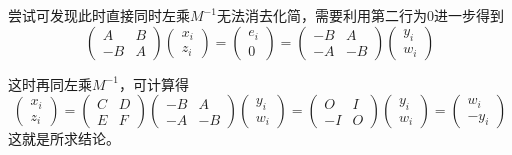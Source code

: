 \documentclass[a4paper,UTF8,fontset=windows]{ctexart}
\begin{document}
\begin{enumerate}
\begin{enumerate}
\begin{enumerate}
            尝试可发现此时直接同时左乘$M^{-1}$无法消去化简，需要利用第二行为0进一步得到
            $$\begin{pmatrix}A&B\\-B&A\end{pmatrix}\begin{pmatrix}x_i\\z_i\end{pmatrix}=\begin{pmatrix}e_i\\0\end{pmatrix}=\begin{pmatrix}-B&A\\-A&-B\end{pmatrix}\begin{pmatrix}y_i\\w_i\end{pmatrix}$$

            这时再同左乘$M^{-1}$，可计算得
            $$\begin{pmatrix}x_i\\z_i\end{pmatrix}=\begin{pmatrix}C&D\\E&F\end{pmatrix}\begin{pmatrix}-B&A\\-A&-B\end{pmatrix}\begin{pmatrix}y_i\\w_i\end{pmatrix}=\begin{pmatrix}O&I\\-I&O\end{pmatrix}\begin{pmatrix}y_i\\w_i\end{pmatrix}=\begin{pmatrix}w_i\\-y_i\end{pmatrix}$$
            这就是所求结论。


\end{enumerate}
\end{enumerate}
\end{enumerate}
\end{document}
